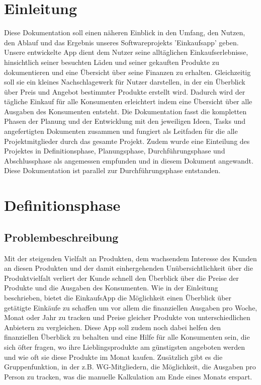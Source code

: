 \documentclass[12pt,a4paper]{article}
\begin{document}
\section*{Einleitung}
Diese Dokumentation soll einen näheren Einblick in den Umfang, 
den Nutzen, den Ablauf und das Ergebnis unseres Softwareprojekts 'Einkaufsapp' geben.  
\newline
Unsere entwickelte App dient dem Nutzer seine alltäglichen Einkaufserlebnisse, hinsichtlich seiner besuchten Läden und seiner gekauften Produkte zu dokumentieren und eine Übersicht über seine Finanzen zu erhalten.
Gleichzeitig soll sie ein kleines Nachschlagewerk für Nutzer darstellen, in der ein Überblick über Preis und Angebot bestimmter Produkte erstellt wird. 
Dadurch wird der tägliche Einkauf für alle Konsumenten erleichtert indem eine Übersicht über alle Ausgaben des Konsumenten entsteht.
\newline
Die Dokumentation fasst die kompletten Phasen der Planung und der Entwicklung mit den jeweiligen Ideen, Tasks und angefertigten Dokumenten zusammen und fungiert als Leitfaden für die alle Projektmitglieder durch das gesamte Projekt.
\newline
Zudem wurde eine Einteilung des Projektes in Definitionsphase, Planungsphase, Durchführungsphase und Abschlussphase als angemessen empfunden und in diesem Dokument angewandt.
Diese Dokumentation ist parallel zur Durchführungsphase entstanden.
\newline
\newpage
\section{Definitionsphase}
\subsection{Problembeschreibung}
Mit der steigenden Vielfalt an Produkten, dem wachsendem Interesse des Kunden an diesen Produkten und der damit einhergehenden Unübersichtlichkeit über die Produktvielfalt verliert der Kunde schnell den Überblick über die Preise der Produkte und die Ausgaben des Konsumenten. 
Wie in der Einleitung beschrieben, bietet die EinkaufsApp die Möglichkeit einen Überblick über getätigte Einkäufe zu schaffen um vor allem die finanziellen Ausgaben pro Woche, Monat oder Jahr zu tracken und Preise gleicher Produkte von unterschiedlichen Anbietern zu vergleichen.  
Diese App soll zudem noch dabei helfen den finanziellen Überblick zu behalten und eine Hilfe für alle Konsumenten sein, die sich öfter fragen, wo ihre Lieblingsprodukte am günstigsten angeboten werden und wie oft sie diese Produkte im Monat kaufen.
Zusätzlich gibt es die Gruppenfunktion, in der z.B. WG-Mitgliedern, die Möglichkeit, die Ausgaben pro Person zu tracken, was die manuelle Kalkulation am Ende eines Monats erspart. 
\end{document}
